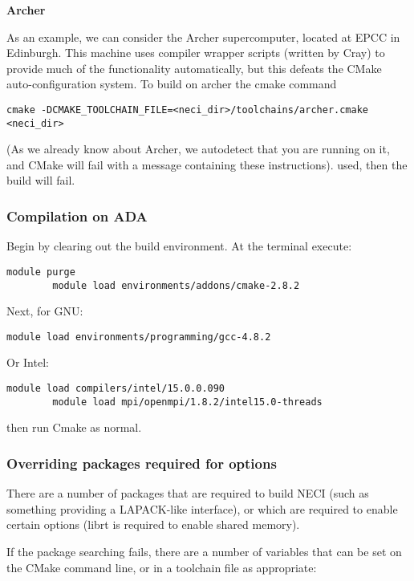 \documentclass[a4paper,notitlepage]{scrreprt}
\begin{document}
    \textbf{Archer}

    As an example, we can consider the Archer supercomputer, located at EPCC in Edinburgh. This
    machine uses compiler wrapper scripts (written by Cray) to provide much of the functionality
    automatically, but this defeats the CMake auto-configuration system. To build on archer the
    cmake command
    \begin{lstlisting}[gobble=4]
        cmake -DCMAKE_TOOLCHAIN_FILE=<neci_dir>/toolchains/archer.cmake <neci_dir>
    \end{lstlisting}

    (As we already know about Archer, we autodetect that you are running on it, and CMake will
    fail with a message containing these instructions).
	used, then the build will fail.

\subsubsection{Compilation on ADA}
	Begin by clearing out the build environment. At the terminal execute:
	\begin{lstlisting}[gobble=4]
		module purge
		module load environments/addons/cmake-2.8.2
	\end{lstlisting}
	Next, for GNU:
	\begin{lstlisting}[gobble=4]
		module load environments/programming/gcc-4.8.2
	\end{lstlisting}
	Or Intel:
	\begin{lstlisting}[gobble=4]
		module load compilers/intel/15.0.0.090
		module load mpi/openmpi/1.8.2/intel15.0-threads
	\end{lstlisting}
	then run Cmake as normal.

\subsubsection{Overriding packages required for options}

    There are a number of packages that are required to build NECI (such as something providing
    a LAPACK-like interface), or which are required to enable certain options (librt is required
    to enable shared memory).

    If the package searching fails, there are a number of variables that can be set on the CMake
    command line, or in a toolchain file as appropriate:
\end{document}
